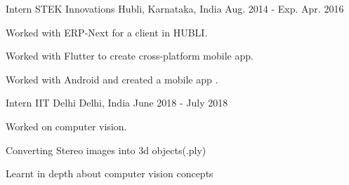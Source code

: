 


\begin{cventries}


\cventry
{Intern} %
{STEK Innovations} %
{Hubli, Karnataka, India} %
{Aug. 2014 - Exp. Apr. 2016} %
{ %
\begin{cvitems}
\item {Worked with ERP-Next for a client in HUBLI.}
\item {Worked with Flutter to create cross-platform mobile app.}
\item {Worked with Android and created a mobile app .}
\end{cvitems}
}
\cventry
{Intern} %
{IIT Delhi} %
{Delhi, India} %
{June 2018 - July 2018} %
{ %
\begin{cvitems}
\item {Worked on computer vision.}
\item {Converting Stereo images into 3d objects(.ply)}
\item{Learnt in depth about computer vision concepts}
\end{cvitems}
}





\end{cventries}